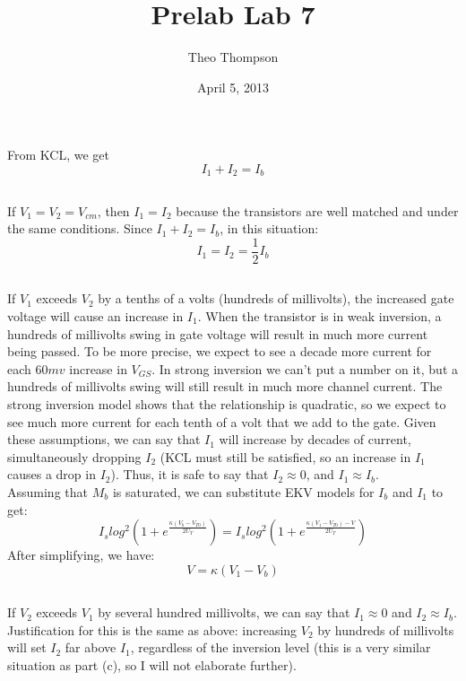 \documentclass{article}
\title{Prelab Lab 7}
\author{Theo Thompson}
\date{April 5, 2013}
\begin{document}
\maketitle

\section{}
\subsection{}
From KCL, we get \[I_1+I_2=I_b\]
\subsection{}
If $V_1=V_2=V_{cm}$, then $I_1=I_2$ because the transistors are well matched and under the same conditions. Since $I_1+I_2=I_b$, in this situation: \[I_1=I_2=\frac{1}{2}I_b\]
\subsection{}
If $V_1$ exceeds $V_2$ by a tenths of a volts (hundreds of millivolts), the increased gate voltage will cause an increase in $I_1$. When the transistor is in weak inversion, a hundreds of millivolts swing in gate voltage will result in much more current being passed. To be more precise, we expect to see a decade more current for each $60mv$ increase in $V_{GS}$. In strong inversion we can't put a number on it, but a hundreds of millivolts swing will still result in much more channel current. The strong inversion model shows that the relationship is quadratic, so we expect to see much more current for each tenth of a volt that we add to the gate. Given these assumptions, we can say that $I_1$ will increase by decades of current, simultaneously dropping $I_2$ (KCL must still be satisfied, so an increase in $I_1$ causes a drop in $I_2$). Thus, it is safe to say that $I_2 \approx 0$, and $I_1 \approx I_b$.\\

Assuming that $M_b$ is saturated, we can substitute EKV models for $I_b$ and $I_1$ to get: \[I_slog^2(1+e^{\frac{\kappa(V_{b}-V_{T0})}{2U_T}})=I_slog^2(1+e^{\frac{\kappa(V_{1}-V_{T0})-V}{2U_T}})\]
After simplifying, we have: \[V=\kappa(V_1-V_b)\]
\subsection{}
If $V_2$ exceeds $V_1$ by several hundred millivolts, we can say that $I_1 \approx 0$ and $I_2 \approx I_b$. Justification for this is the same as above: increasing $V_2$ by hundreds of millivolts will set $I_2$ far above $I_1$, regardless of the inversion level (this is a very similar situation as part (c), so I will not elaborate further).\\
\end{document}
